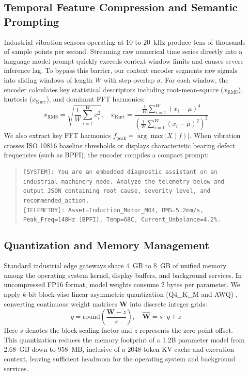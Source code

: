 \documentclass[conference]{IEEEtran}
\begin{document}
\subsection{Temporal Feature Compression and Semantic Prompting}
Industrial vibration sensors operating at 10 to 20~kHz produce tens of thousands of sample points per second. Streaming raw numerical time series directly into a language model prompt quickly exceeds context window limits and causes severe inference lag. To bypass this barrier, our context encoder segments raw signals into sliding windows of length $W$ with step overlap $\sigma$. For each window, the encoder calculates key statistical descriptors including root-mean-square ($x_{\text{RMS}}$), kurtosis ($x_{\text{Kurt}}$), and dominant FFT harmonics:
\begin{equation}
x_{\text{RMS}} = \sqrt{\frac{1}{W} \sum_{i=1}^{W} x_i^2}, \quad x_{\text{Kurt}} = \frac{\frac{1}{W}\sum_{i=1}^{W}(x_i - \mu)^4}{\left(\frac{1}{W}\sum_{i=1}^{W}(x_i - \mu)^2\right)^2}
\end{equation}
We also extract key FFT harmonics $f_{\text{peak}} = \arg\max |X(f)|$. When vibration crosses ISO 10816 baseline thresholds or displays characteristic bearing defect frequencies (such as BPFI), the encoder compiles a compact prompt:
\begin{quote}
\small\texttt{[SYSTEM]: You are an embedded diagnostic assistant on an industrial machinery node. Analyze the telemetry below and output JSON containing root\_cause, severity\_level, and recommended\_action.} \\
\texttt{[TELEMETRY]: Asset=Induction\_Motor\_M04, RMS=5.2mm/s, Peak\_Freq=148Hz (BPFI), Temp=68C, Current\_Unbalance=4.2\%.}
\end{quote}

\subsection{Quantization and Memory Management}
Standard industrial edge gateways share 4~GB to 8~GB of unified memory among the operating system kernel, display buffers, and background services. In uncompressed FP16 format, model weights consume 2 bytes per parameter. We apply $k$-bit block-wise linear asymmetric quantization (Q4\_K\_M and AWQ) \cite{lin2024awq, gerganov2023llamacpp}, converting continuous weight matrices $\mathbf{W}$ into discrete integer grids:
\begin{equation}
q = \text{round}\left( \frac{\mathbf{W} - z}{s} \right), \quad \hat{\mathbf{W}} = s \cdot q + z
\end{equation}
Here $s$ denotes the block scaling factor and $z$ represents the zero-point offset. This quantization reduces the memory footprint of a 1.2B parameter model from 2.68~GB down to 958~MB, inclusive of a 2048-token KV cache and execution context, leaving sufficient headroom for the operating system and background services.
\end{document}
